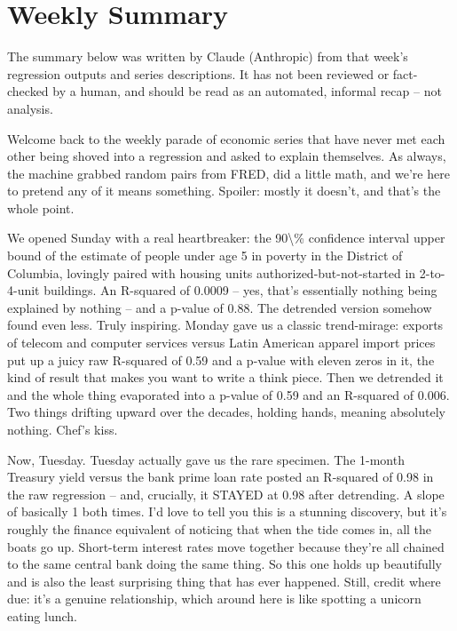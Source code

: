 \section{Weekly Summary}

\begin{tcolorbox}[colback=yellow!10,colframe=black!50,title=AI-Generated Content]
\noindent The summary below was written by Claude (Anthropic) from that week's regression outputs and series descriptions. It has not been reviewed or fact-checked by a human, and should be read as an automated, informal recap -- not analysis.
\end{tcolorbox}

Welcome back to the weekly parade of economic series that have never met each other being shoved into a regression and asked to explain themselves. As always, the machine grabbed random pairs from FRED, did a little math, and we're here to pretend any of it means something. Spoiler: mostly it doesn't, and that's the whole point.

We opened Sunday with a real heartbreaker: the 90\textbackslash{}\% confidence interval upper bound of the estimate of people under age 5 in poverty in the District of Columbia, lovingly paired with housing units authorized-but-not-started in 2-to-4-unit buildings. An R-squared of 0.0009 -- yes, that's essentially nothing being explained by nothing -- and a p-value of 0.88. The detrended version somehow found even less. Truly inspiring. Monday gave us a classic trend-mirage: exports of telecom and computer services versus Latin American apparel import prices put up a juicy raw R-squared of 0.59 and a p-value with eleven zeros in it, the kind of result that makes you want to write a think piece. Then we detrended it and the whole thing evaporated into a p-value of 0.59 and an R-squared of 0.006. Two things drifting upward over the decades, holding hands, meaning absolutely nothing. Chef's kiss.

Now, Tuesday. Tuesday actually gave us the rare specimen. The 1-month Treasury yield versus the bank prime loan rate posted an R-squared of 0.98 in the raw regression -- and, crucially, it STAYED at 0.98 after detrending. A slope of basically 1 both times. I'd love to tell you this is a stunning discovery, but it's roughly the finance equivalent of noticing that when the tide comes in, all the boats go up. Short-term interest rates move together because they're all chained to the same central bank doing the same thing. So this one holds up beautifully and is also the least surprising thing that has ever happened. Still, credit where due: it's a genuine relationship, which around here is like spotting a unicorn eating lunch.

